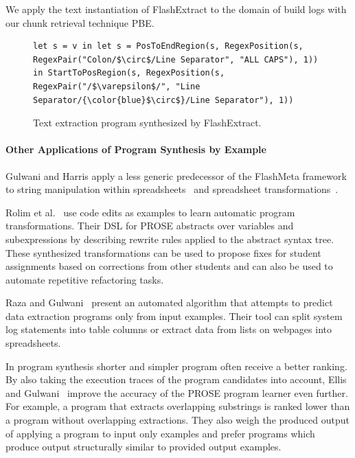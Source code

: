 \documentclass[\myrootdir/main.tex]{subfiles}
\begin{document}
We apply the text instantiation of FlashExtract to the domain of build logs with our chunk retrieval technique PBE\@.

\begin{figure}[]
  \centering
  \begin{lstlisting}[breaklines=true]
let s = v in let s = PosToEndRegion(s, RegexPosition(s, RegexPair("Colon/$\circ$/Line Separator", "ALL CAPS"), 1)) in StartToPosRegion(s, RegexPosition(s, RegexPair("/$\varepsilon$/", "Line Separator/{\color{blue}$\circ$}/Line Separator"), 1))
  \end{lstlisting}  
  \caption{Text extraction program synthesized by FlashExtract.}
  \label{lst:prose-program}
\end{figure}

\paragraph{Other Applications of Program Synthesis by Example}
Gulwani and Harris apply a less generic predecessor of the FlashMeta framework to string manipulation within spreadsheets~\cite{gulwani2011automating} and spreadsheet transformations~\cite{harris2011spreadsheet}.

Rolim et al.~\cite{rolim2017learning} use code edits as examples to learn automatic program transformations.
Their DSL for PROSE abstracts over variables and subexpressions by describing rewrite rules applied to the abstract syntax tree.
These synthesized transformations can be used to propose fixes for student assignments based on corrections from other students and can also be used to automate repetitive refactoring tasks.

Raza and Gulwani~\cite{raza2017automated} present an automated algorithm that attempts to predict data extraction programs only from input examples.
Their tool can split system log statements into table columns or extract data from lists on webpages into spreadsheets.

In program synthesis shorter and simpler program often receive a better ranking.
By also taking the execution traces of the program candidates into account, Ellis and Gulwani~\cite{ellis2017learning} improve the accuracy of the PROSE program learner even further.
For example, a program that extracts overlapping substrings is ranked lower than a program without overlapping extractions.
They also weigh the produced output of applying a program to input only examples and prefer programs which produce output structurally similar to provided output examples.
\end{document}
